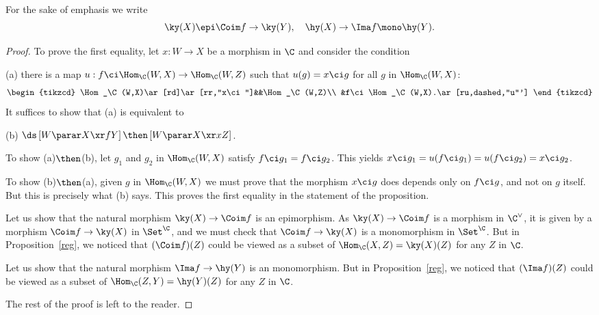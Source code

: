 \documentclass[12pt]{article}
\theoremstyle{remark}
\theoremstyle{definition}
\begin{document}
For the sake of emphasis we write
$$
\ky(X)\epi\Coim f\to\ky(Y),\quad\hy(X)\to\Ima f\mono\hy(Y).
$$ 

\begin{proof}
To prove the first equality, let $x:W\to X$ be a morphism in $\C$ and consider the condition

\nn(a) there is a map $u:f\ci\Hom_\C(W,X)\to\Hom_\C(W,Z)$ such that $u(g)=x\ci g$ for all $g$ in $\Hom_\C(W,X)$: 
$$
\begin{tikzcd}
\Hom_\C(W,X)\ar[rd]\ar[rr,"x\ci"]&&\Hom_\C(W,Z)\\ 
&f\ci\Hom_\C(W,X).\ar[ru,dashed,"u"']
\end{tikzcd} 
$$ 
It suffices to show that (a) is equivalent to 

\nn(b) $\ds\left[W\parar X\xr fY\right]\then\left[W\parar X\xr xZ\right]$.

To show (a)$\then$(b), let $g_1$ and $g_2$ in $\Hom_\C(W,X)$ satisfy $f\ci g_1=f\ci g_2$. This yields $x\ci g_1=u(f\ci g_1)=u(f\ci g_2)=x\ci g_2$. 

To show (b)$\then$(a), given $g$ in $\Hom_\C(W,X)$ we must prove that the morphism $x\ci g$ does depends only on $f\ci g$, and not on $g$ itself. But this is precisely what (b) says. This proves the first equality in the statement of the proposition.

Let us show that the natural morphism $\ky(X)\to\Coim f$ is an epimorphism. As $\ky(X)\to\Coim f$ is a morphism in $\C^\vee$, it is given by a morphism $\Coim f\to\ky(X)$ in $\Set^\C$, and we must check that $\Coim f\to\ky(X)$ is a monomorphism in $\Set^\C$. But in Proposition~\ref{reg}, we noticed that $(\Coim f)(Z)$ could be viewed as a subset of $\Hom_\C(X,Z)=\ky(X)(Z)$ for any $Z$ in $\C$. 

Let us show that the natural morphism $\Ima f\to\hy(Y)$ is an monomorphism. But in Proposition~\ref{reg}, we noticed that $(\Ima f)(Z)$ could be viewed as a subset of $\Hom_\C(Z,Y)=\hy(Y)(Z)$ for any $Z$ in $\C$. 

The rest of the proof is left to the reader.
\end{proof}
\end{document}
